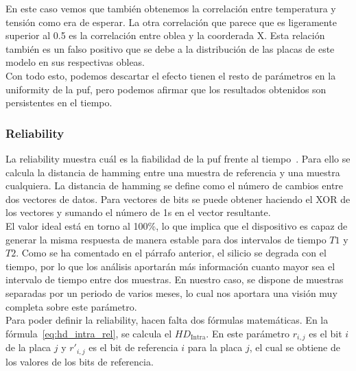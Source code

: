 \documentclass[spanish]{template/minim}
\begin{document}
En este caso vemos que también obtenemos la correlación entre temperatura y tensión como era de esperar. La otra correlación que parece que es ligeramente superior al 0.5 es la correlación entre oblea y la coorderada X. Esta relación también es un falso positivo que se debe a la distribución de las placas de este modelo en sus respectivas obleas.\\

Con todo esto, podemos descartar el efecto tienen el resto de parámetros en la uniformity de la \gls{puf}, pero podemos afirmar que los resultados obtenidos son persistentes en el tiempo.\\


\subsubsection{Reliability}\label{sec:reliability}

La reliability muestra cuál es la fiabilidad de la \gls{puf} frente al tiempo~. Para ello se calcula la {\color{accent}distancia de hamming} entre una muestra de referencia y una muestra cualquiera. La distancia de hamming se define como el número de cambios entre dos vectores de datos. Para vectores de bits se puede obtener haciendo el XOR de los vectores y sumando el número de 1s en el vector resultante.\\

El valor ideal está en torno al 100\%, lo que implica que el dispositivo es capaz de generar la misma respuesta de manera estable para dos intervalos de tiempo $T1$ y $T2$. Como se ha comentado en el párrafo anterior, el silicio se degrada con el tiempo, por lo que los análisis aportarán más información cuanto mayor sea el intervalo de tiempo entre dos muestras. En nuestro caso, se dispone de muestras separadas por un periodo de varios meses, lo cual nos aportara una visión muy completa sobre este parámetro.\\

Para poder definir la reliability, hacen falta dos fórmulas matemáticas. En la fórmula~\ref{eq:hd_intra_rel}, se calcula el $HD_{\text{Intra}}$. En este parámetro $r_{i,j}$ es el bit $i$ de la placa $j$ y $r'_{i,j}$ es el bit de referencia $i$ para la placa $j$, el cual se obtiene de los valores de los bits de referencia.\\
\end{document}
